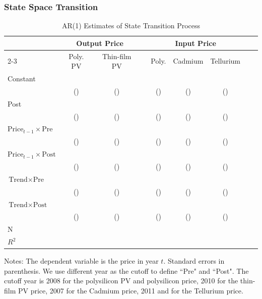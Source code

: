 \documentclass[12pt]{article}
\begin{document}
\subsubsection{State Space Transition}

\begin{table}[!h]
\centering
\caption{AR(1) Estimates of State Transition Process}
\label{tab:est_state_transition}
\begin{threeparttable}
\begin{tabularx}{0.9\textwidth}{Xcccccccc}
\toprule
& \multicolumn{2}{c}{Output Price} &&  \multicolumn{3}{c}{Input Price} \\
\cmidrule{2-3} \cmidrule{5-7}
 & Poly. PV  & Thin-film PV &&  Poly. & Cadmium & Tellurium \\
\midrule
Constant &   &   &&  &  & \\
 &  () &  ()  &&  () &  () &  () \\
Post &   &   &&  &  & \\
 &  () &  ()  &&  () &  () &  () \\
$\text{Price}_{t-1} \times \text{Pre}$  &   &&   &  &  & \\
 &  () &  ()  &&  () &  () &  () \\
$\text{Price}_{t-1} \times \text{Post}$  &   &&   &  &  & \\
 &  () &  ()  &&  () &  () &  () \\
$\text{Trend} \times \text{Pre}$  &   &   &&  &  & \\
 &  () &  ()  &&  () &  () &  () \\
$\text{Trend} \times \text{Post}$  &   &   &&  &  & \\
 &  () &  ()  &&  () &  () &  () \\
\midrule
N &   &   &&  &  & \\
$R^2$ &   &&   &  &  & \\
\bottomrule
\end{tabularx}
\begin{tablenotes}
  \item Notes: The dependent variable is the price in year $t$. Standard errors in parenthesis. We use different year as the cutoff to define ``Pre" and ``Post". The cutoff year is 2008 for the polysilicon PV and polysilicon price, 2010 for the thin-film PV price, 2007 for the Cadmium price, 2011 and for the Tellurium price.
\end{tablenotes}
\end{threeparttable}
\end{table}
\end{document}
